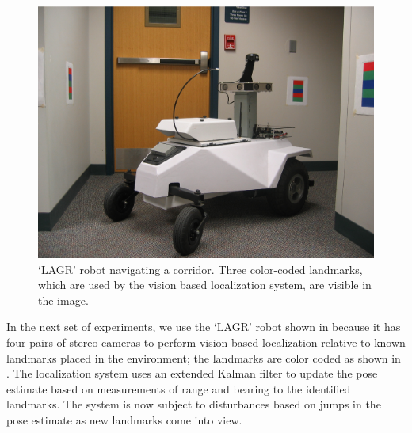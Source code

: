 \begin{figure}[bt]
  \centering 
   \includegraphics[width=\linewidth]{graphics/Lagr_14Oct07_008.eps}

   \caption[`LAGR' robot navigating a corridor.]{`LAGR' robot navigating a corridor.
     Three color-coded landmarks, which are used by the vision based localization
     system, are visible in the image.}
   \label{fig:lagr_nook}
\end{figure}

In the next set of experiments, we use the `LAGR' robot shown in 
because it has four pairs of stereo cameras to perform vision based localization relative
to known landmarks placed in the environment; the landmarks are color coded as shown
in .  The localization system uses an extended Kalman filter to
update the pose estimate based on measurements of range and bearing to the identified
landmarks.  The system is now subject to disturbances based on jumps in the pose
estimate as new landmarks come into view.


